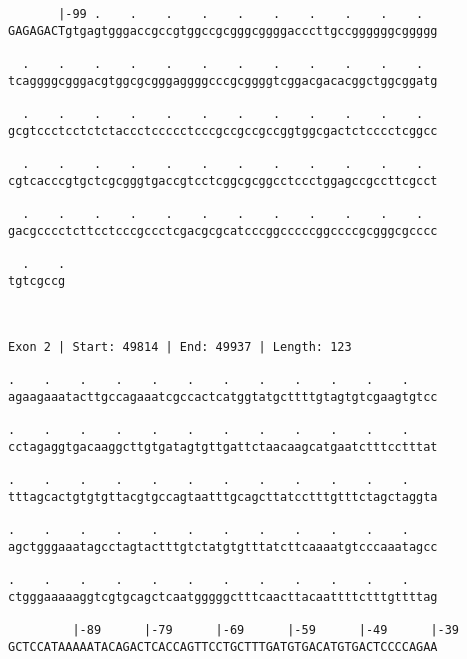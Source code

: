 \documentclass{article}
\begin{document}
\begin{Verbatim}
       |-99 .    .    .    .    .    .    .    .    .    .  
GAGAGACTgtgagtgggaccgccgtggccgcgggcggggacccttgccggggggcggggg
                                                            
  .    .    .    .    .    .    .    .    .    .    .    .  
tcaggggcgggacgtggcgcgggaggggcccgcggggtcggacgacacggctggcggatg
                                                            
  .    .    .    .    .    .    .    .    .    .    .    .  
gcgtccctcctctctaccctccccctcccgccgccgccggtggcgactctcccctcggcc
                                                            
  .    .    .    .    .    .    .    .    .    .    .    .  
cgtcacccgtgctcgcgggtgaccgtcctcggcgcggcctccctggagccgccttcgcct
                                                            
  .    .    .    .    .    .    .    .    .    .    .    .  
gacgcccctcttcctcccgccctcgacgcgcatcccggcccccggccccgcgggcgcccc
                                                            
  .    .
tgtcgccg
        
        
 
Exon 2 | Start: 49814 | End: 49937 | Length: 123
 
.    .    .    .    .    .    .    .    .    .    .    .    
agaagaaatacttgccagaaatcgccactcatggtatgcttttgtagtgtcgaagtgtcc
                                                            
.    .    .    .    .    .    .    .    .    .    .    .    
cctagaggtgacaaggcttgtgatagtgttgattctaacaagcatgaatctttcctttat
                                                            
.    .    .    .    .    .    .    .    .    .    .    .    
tttagcactgtgtgttacgtgccagtaatttgcagcttatcctttgtttctagctaggta
                                                            
.    .    .    .    .    .    .    .    .    .    .    .    
agctgggaaatagcctagtactttgtctatgtgtttatcttcaaaatgtcccaaatagcc
                                                            
.    .    .    .    .    .    .    .    .    .    .    .    
ctgggaaaaaggtcgtgcagctcaatgggggctttcaacttacaattttctttgttttag
                                                            
         |-89      |-79      |-69      |-59      |-49      |-39
GCTCCATAAAAATACAGACTCACCAGTTCCTGCTTTGATGTGACATGTGACTCCCCAGAA
                                                            

\end{Verbatim}
\end{document}
